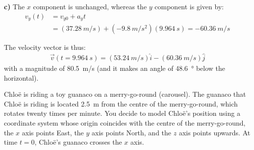 \begin{solution}
\textbf{c)} The $x$ component is unchanged, whereas the $y$ component is given by:
\begin{align*}
v_y(t) &= v_{y0}+a_yt\\
&=(\SI{37.28}{m/s})+(\SI{-9.8}{m/s^2})(\SI{9.964}{s})=\SI{-60.36}{m/s}
\end{align*}

The velocity vector is thus:
\begin{align*}
\vec v(t=\SI{9.964}{s})=(\SI{53.24}{m/s})\hat i - (\SI{60.36}{m/s}) \hat j
\end{align*}
with a magnitude of \SI{80.5}{m/s} (and it makes an angle of \SI{48.6}{\degree} below the horizontal).
\end{solution}


\question Chlo\"e is riding a toy guanaco on a merry-go-round (carousel). The guanaco that Chlo\"e is riding is located \SI{2.5}{m} from the centre of the merry-go-round, which rotates twenty times per minute. You decide to model Chlo\"e's position using a coordinate system whose origin coincides with the centre of the merry-go-round, the $x$ axis points East, the $y$ axis points North, and the $z$ axis points upwards. At time $t=0$, Chlo\"e's guanaco crosses the $x$ axis. 
